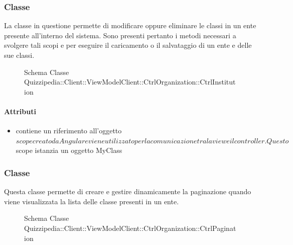 \subsubsection{Classe }
La classe in questione permette di modificare oppure eliminare le classi in un ente presente all'interno del sistema.
Sono presenti pertanto i metodi necessari a svolgere tali scopi e per eseguire il caricamento o il salvataggio di un ente e delle sue classi.
\begin{figure}[H]
\centering
\noindent{}
\caption[Schema Classe CtrlInstitution]{Schema Classe Quizzipedia::Client::ViewModelClient::CtrlOrganization::CtrlInstitution}
\end{figure}
\paragraph{Attributi}
\begin{itemize}
\item {}
\newline
contiene un riferimento all'oggetto $scope creato da Angular e viene utilizzato per la comunicazione tra la view e il controller. Questo $scope istanzia un oggetto MyClass
\end{itemize}
\subsubsection{Classe }
Questa classe permette di creare e gestire dinamicamente la paginazione quando viene visualizzata la lista delle classe presenti in un ente.
\begin{figure}[H]
\centering
\noindent{}
\caption[Schema Classe CtrlPagination]{Schema Classe Quizzipedia::Client::ViewModelClient::CtrlOrganization::CtrlPagination}
\end{figure}
